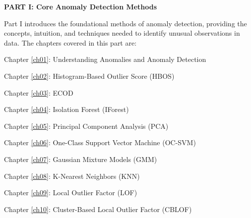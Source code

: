\newpage

\vspace*{\fill}


\Large
\noindent\textbf{PART I: Core Anomaly Detection Methods}
\normalsize
\vspace*{3cm}


Part I introduces the foundational methods of anomaly detection, providing the concepts, intuition, and techniques needed to identify unusual observations in data. The chapters covered in this part are:

\vspace*{0.5cm}

Chapter \ref{ch01}: Understanding Anomalies and Anomaly Detection

Chapter \ref{ch02}: Histogram-Based Outlier Score (HBOS)

Chapter \ref{ch03}: ECOD

Chapter \ref{ch04}: Isolation Forest (IForest)

Chapter \ref{ch05}: Principal Component Analysis (PCA)

Chapter \ref{ch06}: One-Class Support Vector Machine (OC-SVM)

Chapter \ref{ch07}: Gaussian Mixture Models (GMM)

Chapter \ref{ch08}: K-Nearest Neighbors (KNN)

Chapter \ref{ch09}: Local Outlier Factor (LOF)

Chapter \ref{ch10}: Cluster-Based Local Outlier Factor (CBLOF)

\vspace*{\fill}

